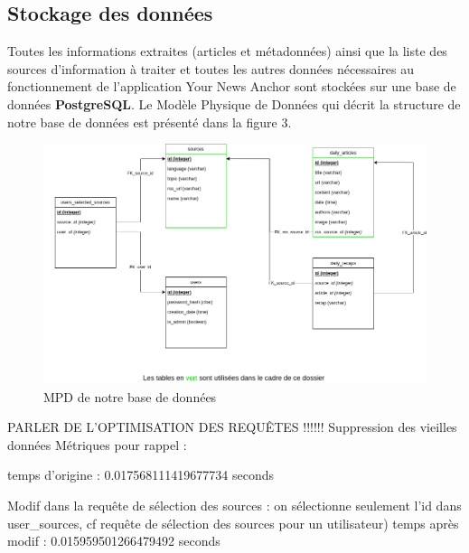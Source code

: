 \documentclass[french]{article}
\begin{document}
    \subsection{Stockage des données}

    Toutes les informations extraites (articles et métadonnées) ainsi que la liste des sources d'information à traiter et toutes les autres données nécessaires au fonctionnement de l'application Your News Anchor sont stockées sur une base de données \textbf{PostgreSQL}. Le Modèle Physique de Données qui décrit la structure de notre base de données est présenté dans la figure 3.

    \begin{figure}[h]
        \includegraphics[width=12cm]{mpd_e1}
        \centering
        \caption{MPD de notre base de données}
        \centering
    \end{figure}

    PARLER DE L'OPTIMISATION DES REQUÊTES !!!!!! Suppression des vieilles données 
    Métriques pour rappel : 

    temps d'origine : 0.017568111419677734 seconds

    Modif dans la requête de sélection des sources : on sélectionne seulement l'id dans user\_sources, cf requête de sélection des sources pour un utilisateur)
    temps après modif : 0.015959501266479492 seconds

    
\end{document}
